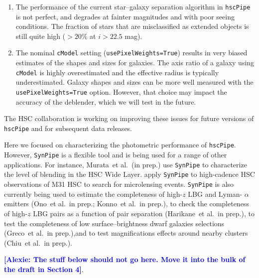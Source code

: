 \documentclass[useamsfonts]{pasj01}
\def\etal{{\ et al.~}}
\newcommand{\alexie}[1]{\textcolor{blue}{\textbf{[Alexie: #1]}}}
\def\hscpipe{\texttt{hscPipe}}
\def\synpipe{\texttt{SynPipe}}
\def\cmodel{\texttt{cModel}}
\begin{document}
    \begin{enumerate}

        \item The performance of the current star--galaxy separation algorithm in \hscpipe{}
            is not perfect,  and degrades at fainter magnitudes and with poor seeing
            conditions.
            The fraction of stars that are misclassified as extended objects is still
            quite high ($>20$\% at $i> 22.5$ mag).

        \item The nominal \cmodel{} setting  (\texttt{usePixelWeights=True}) results
            in very biased estimates of the shapes and sizes for galaxies. The axis ratio of a galaxy using \cmodel{} is highly overestimated and the effective radius is typically underestimated.  Galaxy shapes and sizes can be more well measured with the \texttt{usePixelWeights=True} option.
            However, that choice may impact the accuracy of the deblender, which we 
            will test in the future.
    \end{enumerate}

    The HSC collaboration is working on improving these issues for future versions of \hscpipe{} and for subsequent data releases.  
    

    Here we  focused on characterizing the  photometric performance of  \hscpipe{}.  However,  \synpipe{} is a flexible tool and is being used for a range of other applications. For instance,  Murata\etal (in prep.) use \synpipe{} to characterize the level of blending in the HSC Wide Layer.  \citep{Niikura2017} apply \synpipe{} to high-cadence HSC observations of  M31 HSC to search for microlensing events. \synpipe{} is also currently being used to estimate the completeness of  high-$z$ LBG and Lyman- $\alpha$ emitters (Ono\etal in prep.; Konno\etal in prep.),  to check the completeness of  high-$z$ LBG pairs as a function of pair separation (Harikane\etal in prep.), to test the completeness of low surface--brightness dwarf galaxies selections (Greco\etal in prep.),and to test magnifications effects around nearby clusters (Chiu\etal in prep.).

    
    \alexie{The stuff below should not go here. Move it into the bulk of the draft in Section 4}.
    
\end{document}
